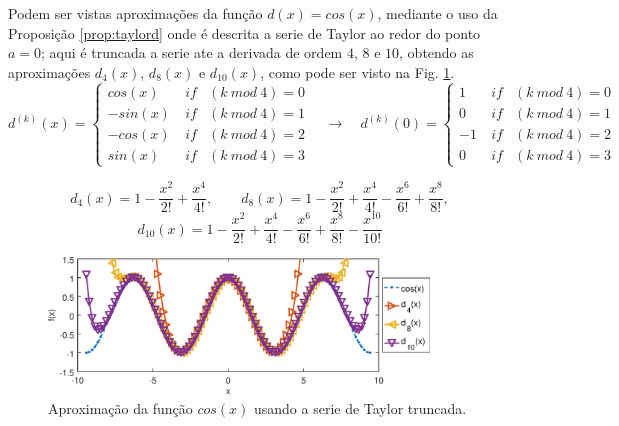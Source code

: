 \begin{example}
Podem ser vistas aproximações da função $d(x)=cos(x)$, 
mediante o uso da Proposição \ref{prop:taylord} onde é descrita a serie de Taylor ao redor do ponto $a=0$;
aqui é truncada a serie ate a derivada de ordem $4$, $8$ e $10$,
obtendo as aproximações $d_4(x)$, $d_8(x)$ e $d_{10}(x)$,
como pode ser visto na Fig. \ref{fig:taylore}.
\begin{equation}
d^{(k)}(x)=
\left\{
\begin{matrix}
cos(x) & ~if & (k~mod~4)=0\\
-sin(x)& ~if & (k~mod~4)=1\\
-cos(x)& ~if & (k~mod~4)=2\\
sin(x) & ~if & (k~mod~4)=3
\end{matrix}
\right.
\quad \rightarrow \quad
d^{(k)}(0)=
\left\{
\begin{matrix}
1 & ~if & (k~mod~4)=0\\
0& ~if & (k~mod~4)=1\\
-1& ~if & (k~mod~4)=2\\
0 & ~if & (k~mod~4)=3
\end{matrix}
\right.
\end{equation}

\begin{equation}
d_{4}(x)=
1
-\frac{x^{2}}{2!} 
+\frac{x^{4}}{4!},
\qquad 
d_{8}(x)=
1
-\frac{x^{2}}{2!} 
+\frac{x^{4}}{4!} 
-\frac{x^{6}}{6!} 
+\frac{x^{8}}{8!}, 
\end{equation}
\begin{equation}
d_{10}(x)=
1
-\frac{x^{2}}{2!} 
+\frac{x^{4}}{4!} 
-\frac{x^{6}}{6!} 
+\frac{x^{8}}{8!} 
-\frac{x^{10}}{10!} 
\end{equation}
\end{example}

\begin{figure}[!h]
  \centering
    \includegraphics[width=0.90\textwidth]{chapters/funcoes/mcode/taylore.eps}
  \caption{Aproximação da função $cos(x)$ usando a serie de Taylor truncada.}
    \label{fig:taylore}
\end{figure}
 
